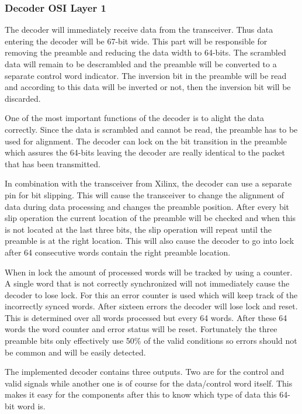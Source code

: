 	\subsubsection[Decoder]{Decoder \hfill OSI Layer 1}
		The decoder will immediately receive data from the transceiver. Thus data entering the decoder will be 67-bit wide. This part will be responsible for removing the preamble and reducing the data width to 64-bits. The scrambled data will remain to be descrambled and the preamble will be converted to a separate control word indicator. The inversion bit in the preamble will be read and according to this data will be inverted or not, then the inversion bit will be discarded.
		
		One of the most important functions of the decoder is to alight the data correctly. Since the data is scrambled and cannot be read, the preamble has to be used for alignment. The decoder can lock on the bit transition in the preamble which assures the 64-bits leaving the decoder are really identical to the packet that has been transmitted. 
		
		In combination with the transceiver from Xilinx, the decoder can use a separate pin for bit slipping. This will cause the transceiver to change the alignment of data during data processing and changes the preamble position. After every bit slip operation the current location of the preamble will be checked and when this is not located at the last three bits, the slip operation will repeat until the preamble is at the right location. This will also cause the decoder to go into lock after 64 consecutive words contain the right preamble location.
		
		When in lock the amount of processed words will be tracked by using a counter. A single word that is not correctly synchronized will not immediately cause the decoder to lose lock. For this an error counter is used which will keep track of the incorrectly synced words. After sixteen errors the decoder will lose lock and reset. This is determined over all words processed but every 64 words. After these 64 words the word counter and error status will be reset. Fortunately the three preamble bits only effectively use 50\% of the valid conditions so errors should not be common and will be easily detected.
		
		The implemented decoder contains three outputs. Two are for the control and valid signals while another one is of course for the data/control word itself. This makes it easy for the components after this to know which type of data this 64-bit word is.
		
